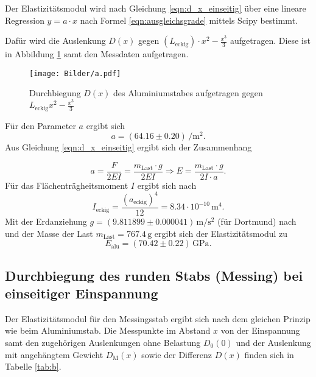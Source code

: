 Der Elastizitätsmodul wird nach Gleichung \eqref{eqn:d_x_einseitig} über eine lineare Regression $y= a\cdot x$ nach Formel \eqref{eqn:ausgleichsgrade} mittels Scipy \cite{scipy} bestimmt.

Dafür wird die Auslenkung $D(x)$ gegen $(L_{\mathrm{eckig}})\cdot x^2-\frac{x^3}{3}$ aufgetragen.
Diese ist in Abbildung \ref{fig:alu_einseitig} samt den Messdaten aufgetragen.
\begin{figure}
	\centering
	\texttt{[image: Bilder/a.pdf]}
	\caption{Durchbiegung $D(x)$ des Aluminiumstabes aufgetragen gegen $L_{\mathrm{eckig}}x^2-\frac{x^3}{3}$}
	\label{fig:alu_einseitig}
\end{figure}
Für den Parameter $a$ ergibt sich
\begin{equation*}
	a=(64.16\pm 0.20) \,\si{\per\square\meter}  \text{.}
\end{equation*}
Aus Gleichung \eqref{eqn:d_x_einseitig} ergibt sich der Zusammenhang

\begin{equation}
	a= \frac{F}{2EI}=\frac{m_{\mathrm{Last}}\cdot g}{2EI} \Rightarrow E=\frac{m_{\mathrm{Last}}\cdot g}{2I\cdot a} \text{.}
\end{equation}
Für das Flächenträgheitsmoment $I$ ergibt sich nach \cite{bla}
\begin{equation}
	I_{\mathrm{eckig}}=\frac{(a_{\mathrm{eckig}})^4}{12}= 8.34 \cdot 10^{-10} \,\si{\meter\tothe{4}}	 \text{.}
\end{equation}
Mit der Erdanziehung $g=(9.811899 \pm 0.000041) \,\si{\meter\per\square\second}$ (für Dortmund) nach \cite{G} und der Masse der Last $m_{\mathrm{Last}}=767.4\,\si{\gram}$ ergibt sich der Elastizitätsmodul zu
\begin{equation*}
	E_{\mathrm{alu}}= (70.42 \pm 0.22)\,\si{\giga\pascal} \text{.}
\end{equation*}
\FloatBarrier
\subsection{Durchbiegung des runden Stabs (Messing) bei einseitiger Einspannung}
Der Elastizitätsmodul für den Messingsstab ergibt sich nach dem gleichen Prinzip wie beim Aluminiumstab.
Die Messpunkte im Abstand $x$ von der Einspannung samt den zugehörigen Auslenkungen ohne Belastung $D_{\mathrm{0}}(0)$
und der Auslenkung mit angehängtem Gewicht $D_{\mathrm{M}}(x)$ sowie der Differenz $D(x)$ finden sich in Tabelle \ref{tab:b}.

